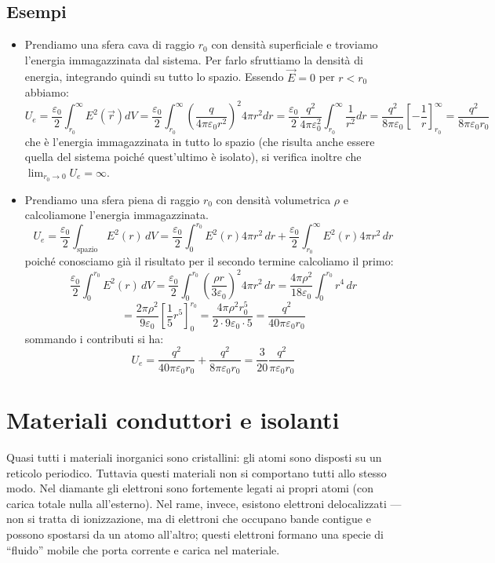 \documentclass{book}
\begin{document}
\section{Esempi}
\begin{itemize}
    \item Prendiamo una sfera cava di raggio $r_0$ con densità superficiale e troviamo l'energia immagazzinata dal sistema.
    Per farlo sfruttiamo la densità di energia, integrando quindi su tutto lo spazio.
    Essendo $\vec{E}=0$ per $r<r_0$
    abbiamo:
$$
U_e = \frac{\varepsilon_0}{2}\int_{r_0}^{\infty} E^2(\vec{r}) dV =  \frac{\varepsilon_0}{2}\int_{r_0}^{\infty} \left(\frac{q}{4 \pi \varepsilon_0 r^2} \right)^2  4 \pi r^2 dr =  \frac{\varepsilon_0}{2} \frac{q^2}{4 \pi \varepsilon_0^2}  \int_{r_0}^{\infty} \frac{1}{r^2} dr = \frac{q^2}{8 \pi \varepsilon_0}\left[-\frac{1}{r} \right]_{r_0}^{\infty} = \frac{q^2}{8 \pi \varepsilon_0 r_0}  
$$
che è l'energia immagazzinata in tutto lo spazio (che risulta anche essere quella del sistema poiché quest'ultimo è isolato),
si verifica inoltre che 
$\lim_{r_0 \to 0} U_e = \infty$.

\item Prendiamo una sfera piena di raggio $r_0$ con densità volumetrica $\rho$ e calcoliamone l'energia immagazzinata.
$$
U_e = \frac{\varepsilon_0}{2} \int_{\text{spazio}} E^2(r) \, dV = \frac{\varepsilon_0}{2} \int_0^{r_0} E^2(r) 4\pi r^2 \, dr + \frac{\varepsilon_0}{2} \int_{r_0}^{\infty} E^2(r) 4\pi r^2 \, dr    
$$
poiché conosciamo già il risultato per il secondo termine calcoliamo il primo:
$$
\frac{\varepsilon_0}{2} \int_0^{r_0} E^2(r) \, dV = \frac{\varepsilon_0}{2} \int_0^{r_0} \left(\frac{\rho r}{3 \varepsilon_0} \right)^2 4 \pi r^2 \, dr =   \frac{4 \pi \rho^2}{18 \varepsilon_0}  \int_0^{r_0}  r^4 \, dr 
$$
$$
= \frac{2\pi \rho^2}{9 \varepsilon_0}  \left[ \frac{1}{5}r^5 \right]_0^{r_0} = \frac{4\pi \rho^2 r_0^5}{2\cdot9\varepsilon_0 \cdot 5} = \frac{q^2}{40 \pi \varepsilon_0 r_0}  
$$
sommando i contributi si ha:
$$
U_e = \frac{q^2}{40 \pi \varepsilon_0 r_0}  + \frac{q^2}{8 \pi \varepsilon_0 r_0}  = \frac{3}{20}\frac{q^2}{\pi\varepsilon_0 r_0}
$$

\end{itemize}

\chapter{Materiali conduttori e isolanti} 


Quasi tutti i materiali inorganici sono cristallini: gli atomi sono disposti su un reticolo periodico. Tuttavia questi materiali non si comportano tutti allo stesso modo. Nel diamante gli elettroni sono fortemente legati ai propri atomi (con carica totale nulla all'esterno). Nel rame, invece, esistono elettroni delocalizzati — non si tratta di ionizzazione, ma di elettroni che occupano bande contigue e possono spostarsi da un atomo all'altro; questi elettroni formano una specie di ``fluido'' mobile che porta corrente e carica nel materiale.
\end{document}
